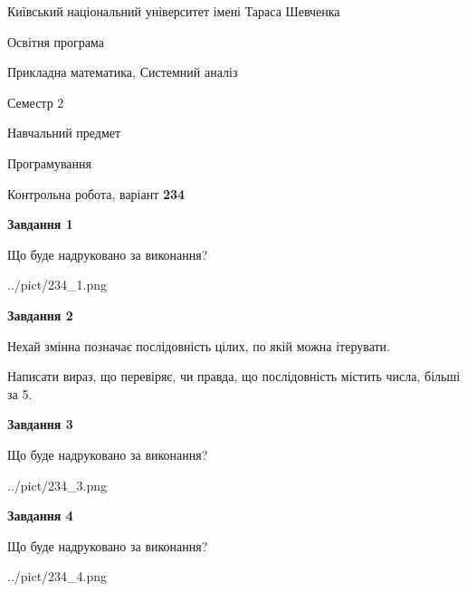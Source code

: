 \documentclass[12pt, ukrainian]{article}
\begin{document}
{{\begin {small}\par
{ \center  Київський національний університет імені Тараса Шевченка \par}
{\parbox {5 cm}{Освітня програма \hfill}{\parbox {8 cm}{Прикладна математика, Системний аналіз \hfill}}\parbox {5 cm}{\hfill Семестр 2}}\par
{\parbox {5 cm} {Навчальний предмет \hfill}\parbox {7 cm}{Програмування \hfill}\parbox {6cm}{\hfill}\par}\vspace{-7pt} \end{small}}{\center Контрольна робота, варіант  \No \textbf
{ 234 }\par}}
{
\begin {large}
{\begin {center}\textbf{Завдання 1}\end {center}}\par
Що буде надруковано за виконання?\par\par
\begin{center}
	{../pict/234_1.png}
\end{center}
\newpage

{\begin {center}\textbf{Завдання 2}\end {center}}\par
Нехай змінна  позначає послідовність цілих, по якій можна ітерувати.

Написати вираз, що перевіряє, чи правда, що послідовність  містить числа, більші за 5.\par
\newpage

{\begin {center}\textbf{Завдання 3}\end {center}}\par
Що буде надруковано за виконання?
\begin{center}
	{../pict/234_3.png}
\end{center}
\newpage

{\begin {center}\textbf{Завдання 4}\end {center}}\par
Що буде надруковано за виконання?\par
\begin{center}
	{../pict/234_4.png}
\end{center}
\newpage


\end{large}}
\end{document}
